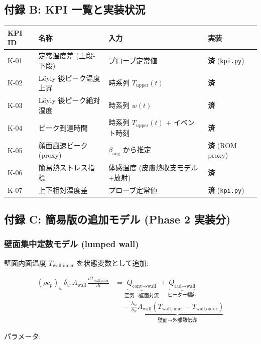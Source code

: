\documentclass[a4paper,11pt]{article}
\begin{document}
\subsection{付録 B: KPI 一覧と実装状況}

{\small
\noindent
\begin{tabularx}{\textwidth}{|l|L|L|L|}
\hline
\textbf{KPI ID} & \textbf{名称} & \textbf{入力} & \textbf{実装} \\
\hline
K-01 & 定常温度差 (上段-下段) & プローブ定常値 & \textbf{済} (\texttt{kpi.py}) \\
\hline
K-02 & Löyly 後ピーク温度上昇 & 時系列 $T_{\text{upper}}(t)$ & \textbf{済} \\
\hline
K-03 & Löyly 後ピーク絶対湿度 & 時系列 $w(t)$ & \textbf{済} \\
\hline
K-04 & ピーク到達時間 & 時系列 $T_{\text{upper}}(t)$ + イベント時刻 & \textbf{済} \\
\hline
K-05 & 顔面風速ピーク (proxy) & $\beta_{\text{aug}}$ から推定 & \textbf{済} (ROM proxy) \\
\hline
K-06 & 簡易熱ストレス指標 & 体感温度 (皮膚熱収支モデル+放射) & \textbf{済} \\
\hline
K-07 & 上下相対温度差 & プローブ定常値 & \textbf{済} (\texttt{kpi.py}) \\
\hline
\end{tabularx}
}


\subsection{付録 C: 簡易版の追加モデル (Phase 2 実装分)}

\subsubsection{壁面集中定数モデル (lumped wall)}

壁面内面温度 $T_{\text{wall,inner}}$ を状態変数として追加:

\begin{align*}
(\rho c_p)_w \, \delta_w \, A_{\text{wall}} \, \frac{dT_{\text{wall,inner}}}{dt}
&= \underbrace{Q_{\text{conv→wall}}}_{\text{空気→壁面対流}}
+ \underbrace{Q_{\text{rad→wall}}}_{\text{ヒーター輻射}} \\
&\quad - \underbrace{\frac{\lambda_w}{\delta_w} A_{\text{wall}}
  (T_{\text{wall,inner}} - T_{\text{wall,outer}})}_{\text{壁面→外部熱伝導}}
\end{align*}

パラメータ:
\end{document}

